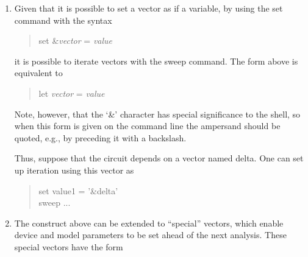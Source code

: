 \begin{enumerate}
{The first line creates a vector named ``{\vt vec}'' of size sufficient
to contain the indices.  The iterated values will be placed in {\vt
vec[5]} and {\vt vec[6]}.  The circuit should reference these values,
either through shell substitution (e.g., {\vt \$\&vec[5]}) or directly
as vectors.

Alternatively, a variable named ``{\vt checkN1}'' can be set.  If the
value of this variable is an integer, that integer will be used as the
index.  If the variable is a name token, then the index will be
supplied by a vector of the given name.  The same applies to {\vt
checkN2}.  The following example illustrates these alternatives:

\begin{quote}
{\vt let vec[10] = 0}\\
{\vt set checkN1 = 5}\\
{\vt let foo = 6}\\
{\vt set checkN2 = foo}\\
{\vt sweep} ...
\end{quote}
}

\item{
Given that it is possible to set a vector as if a variable, by using
the {\cb set} command with the syntax

\begin{quote}
{\vt set \&}{\it vector} {\vt =} {\it value}
\end{quote}

it is possible to iterate vectors with the {\cb sweep} command.  The
form above is equivalent to

\begin{quote}
{\vt let} {\it vector} {\vt =} {\it value}
\end{quote}

Note, however, that the `{\vt \&}' character has special significance
to the {\WRspice} shell, so when this form is given on the command
line the ampersand should be quoted, e.g., by preceding it with a
backslash.

Thus, suppose that the circuit depends on a vector named {\vt delta}. 
One can set up iteration using this vector as

\begin{quote}
{\vt set value1 = '\&delta'}\\
{\vt sweep} ...
\end{quote}
}

\item{
The construct above can be extended to ``special'' vectors, which
enable device and model parameters to be set ahead of the next
analysis.  These special vectors have the form

}
\end{enumerate}
